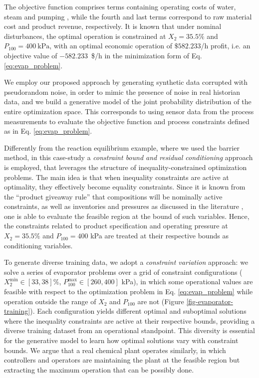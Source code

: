 \documentclass{achemso}
\begin{document}
The objective function comprises terms containing operating costs of water, steam and pumping \cite{kariwala07}, while the fourth and last terms correspond to raw material cost and product revenue, respectively. It is known \cite{kariwala07,Alves2018} that under nominal disturbances, the optimal operation is constrained at $X_2 = 35.5\%$ and $P_{100} = 400~\mathrm{kPa}$, with an optimal economic operation of $\$582.233$/h profit, i.e. an objective value of $-582.233$~\$/h in the minimization form of Eq. \ref{eq:evap_problem}. 

We employ our proposed approach by generating synthetic data corrupted with pseudorandom noise, in order to mimic the presence of noise in real historian data, and we build a generative model of the joint probability distribution of the entire optimization space. This corresponds to using sensor data from the process measurements to evaluate the objective function and process constraints defined as in Eq. \ref{eq:evap_problem}.

Differently from the reaction equilibrium example, where we used the barrier method, in this case-study a \emph{constraint bound and residual conditioning} approach is employed, that leverages the structure of inequality-constrained optimization problems. The main idea is that when inequality constraints are active at optimality, they effectively become equality constraints. Since it is known from the ``product giveaway rule'' \cite{Jacobsen2011,Jacobsen2012,minasidis2015simple} that compositions will be nominally active constraints, as well as inventories and pressures as discussed in the literature \cite{minasidis2015simple}, one is able to evaluate the feasible region at the bound of such variables. Hence, the constraints related to product specification and operating pressure at $X_2 = 35.5\%$ and $P_{100} = 400$ kPa are treated at their respective bounds as conditioning variables.

To generate diverse training data, we adopt a \emph{constraint variation} approach: we solve a series of evaporator problems over a grid of constraint configurations ($X_2^{\min} \in [33, 38]\%$, $P_{100}^{\max} \in [260, 400]$ kPa), in which some operational values are feasible with respect to the optimization problem in Eq. \ref{eq:evap_problem} while operation outside the range of $X_2$ and $P_{100}$ are not (Figure \ref{fig-evaporator-training}). Each configuration yields different optimal and suboptimal solutions where the inequality constraints are active at their respective bounds, providing a diverse training dataset from an operational standpoint. This diversity is essential for the generative model to learn how optimal solutions vary with constraint bounds. We argue that a real chemical plant operates similarly, in which controllers and operators are maintaining the plant at the feasible region but extracting the maximum operation that can be possibly done.
\end{document}

